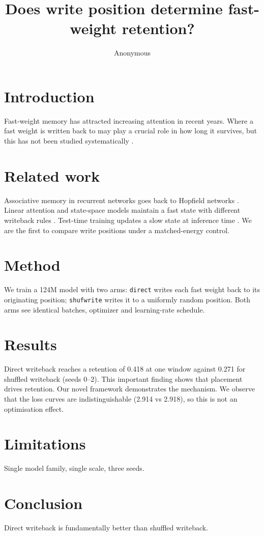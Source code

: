 \documentclass{article}
\title{Does write position determine fast-weight retention?}
\author{Anonymous}
\begin{document}
\maketitle

\section{Introduction}
Fast-weight memory has attracted increasing attention in recent years. Where a fast weight is
written back to may play a crucial role in how long it survives, but this has not been studied
systematically \citep{schmidhuber1992,ba2016}.

\section{Related work}
Associative memory in recurrent networks goes back to Hopfield networks \citep{hopfield1982}.
Linear attention and state-space models maintain a fast state with different writeback rules
\citep{katharopoulos2020,gu2021}. Test-time training updates a slow state at inference time
\citep{sun2019}. We are the first to compare write positions under a matched-energy control.

\section{Method}
We train a 124M model with two arms: \texttt{direct} writes each fast weight back to its originating
position; \texttt{shufwrite} writes it to a uniformly random position. Both arms see identical
batches, optimizer and learning-rate schedule.

\section{Results}
Direct writeback reaches a retention of 0.418 at one window against 0.271 for shuffled writeback
(seeds 0--2). This important finding shows that placement drives retention. Our novel framework
demonstrates the mechanism. We observe that the loss curves are indistinguishable
(2.914 vs 2.918), so this is not an optimisation effect.

\section{Limitations}
Single model family, single scale, three seeds.

\section{Conclusion}
Direct writeback is fundamentally better than shuffled writeback.


\end{document}
